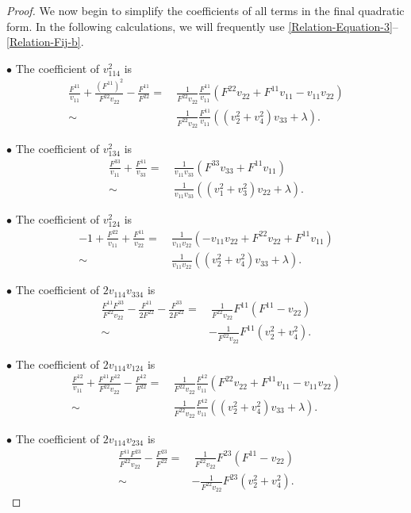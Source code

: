 \documentclass[11pt]{amsart}
\numberwithin{theorem}{section}
\numberwithin{equation}{section}
\begin{document}
\begin{proof}
We now begin to simplify the coefficients of all terms in the final quadratic form. In the following calculations, we will frequently use \eqref{Relation-Equation-3}--\eqref{Relation-Fij-b}.

$\bullet$ The coefficient of $v_{114}^2$ is
\begin{align*}
\frac{F^{11}}{v_{11}}+\frac{(F^{11})^2}{F^{22}v_{22}}-\frac{F^{11}}{F^{22}}
=&~\frac{1}{F^{22}v_{22}}\frac{F^{11}}{v_{11}}(F^{22}v_{22}+F^{11}v_{11}-v_{11}v_{22})\\
\sim&~\frac{1}{F^{22}v_{22}}\frac{F^{11}}{v_{11}}\left((v_2^2+v_4^2)v_{33}+\lambda\right).
\end{align*}
 
$\bullet$ The coefficient of $v_{134}^2$ is
\begin{align*}
\frac{F^{33}}{v_{11}}+\frac{F^{11}}{v_{33}}
=&~\frac{1}{v_{11}v_{33}}(F^{33}v_{33}+F^{11}v_{11})\\
\sim&~\frac{1}{v_{11}v_{33}}\left((v_1^2+v_3^2)v_{22}+\lambda\right).
\end{align*}
 
$\bullet$ The coefficient of $v_{124}^2$ is
\begin{align*}
-1+\frac{F^{22}}{v_{11}}+\frac{F^{11}}{v_{22}}
=&~\frac{1}{v_{11}v_{22}}(-v_{11}v_{22}+F^{22}v_{22}+F^{11}v_{11})\\
\sim&~\frac{1}{v_{11}v_{22}}\left((v_2^2+v_4^2)v_{33}+\lambda\right).
\end{align*}
 
$\bullet$ The coefficient of $2v_{114}v_{334}$ is
\begin{align*}
\frac{F^{11}F^{33}}{F^{22}v_{22}}-\frac{F^{11}}{2F^{22}}-\frac{F^{33}}{2F^{22}}=&~\frac{1}{F^{22}v_{22}}F^{11}(F^{11}-v_{22})\\
\sim&-\frac{1}{F^{22}v_{22}}F^{11}(v_2^2+v_4^2).
\end{align*}
 
$\bullet$ The coefficient of $2v_{114}v_{124}$ is
\begin{align*}
\frac{F^{12}}{v_{11}}+\frac{F^{11}F^{12}}{F^{22}v_{22}}-\frac{F^{12}}{F^{22}}
=&~\frac{1}{F^{22}v_{22}}\frac{F^{12}}{v_{11}}(F^{22}v_{22}+F^{11}v_{11}-v_{11}v_{22})\\
\sim&~\frac{1}{F^{22}v_{22}}\frac{F^{12}}{v_{11}}\left((v_2^2+v_4^2)v_{33}+\lambda\right).
\end{align*}

$\bullet$ The coefficient of $2v_{114}v_{234}$ is
\begin{align*}
\frac{F^{11}F^{23}}{F^{22}v_{22}}-\frac{F^{23}}{F^{22}}
=&~\frac{1}{F^{22}v_{22}}F^{23}(F^{11}-v_{22})\\
\sim&-\frac{1}{F^{22}v_{22}}F^{23}(v_2^2+v_4^2).
\end{align*}
 

\end{proof}
\end{document}
